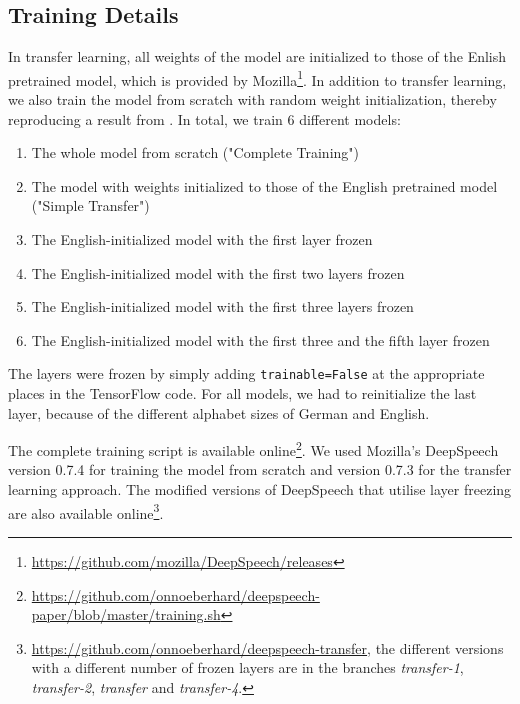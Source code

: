 \documentclass[12pt]{article}    %
\begin{document}
\subsection{Training Details}
In transfer learning, all weights of the model are initialized to those of the Enlish pretrained model, which is provided by Mozilla\footnote{\url{https://github.com/mozilla/DeepSpeech/releases}}. In addition to transfer learning, we also train the model from scratch with random weight initialization, thereby reproducing a result from \textcite{agarwal-zesch-2019-german}. In total, we train 6 different models:
\begin{enumerate}
    \item The whole model from scratch ("Complete Training")
    \item The model with weights initialized to those of the English pretrained model ("Simple Transfer")
    \item The English-initialized model with the first layer frozen
    \item The English-initialized model with the first two layers frozen
    \item The English-initialized model with the first three layers frozen
    \item The English-initialized model with the first three and the fifth layer frozen
\end{enumerate}

The layers were frozen by simply adding \texttt{trainable=False} at the appropriate places in the TensorFlow code. For all models, we had to reinitialize the last layer, because of the different alphabet sizes of German and English.

The complete training script is available online\footnote{\url{https://github.com/onnoeberhard/deepspeech-paper/blob/master/training.sh}}. We used Mozilla's DeepSpeech version 0.7.4 for training the model from scratch and version 0.7.3 for the transfer learning approach. The modified versions of DeepSpeech that utilise layer freezing are also available online\footnote{\url{https://github.com/onnoeberhard/deepspeech-transfer}, the different versions with a different number of frozen layers are in the branches \emph{transfer-1}, \emph{\mbox{transfer-2}}, \emph{transfer} and \emph{\mbox{transfer-4}}.}.
\end{document}

